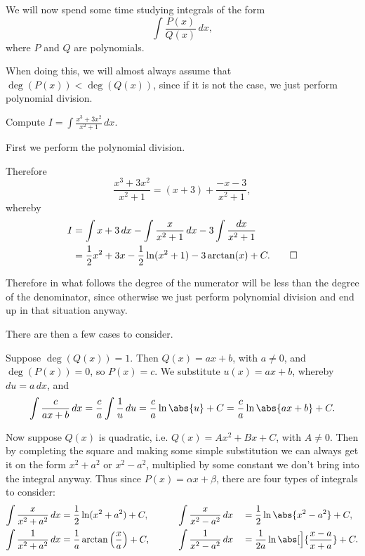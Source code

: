 
We will now spend some time studying integrals of the form
\[
	\int \frac{P(x)}{Q(x)} \, d x,
\]
where $P$ and $Q$ are polynomials.

When doing this, we will almost always assume that $\deg(P(x)) < \deg(Q(x))$, since if it is not the case, we just perform polynomial division.

\begin{example}
	Compute $I = \int \frac{x^3 + 3 x^2}{x^2 + 1} \, d x$.

	\smallskip

	First we perform the polynomial division.
	\begin{figure}[H]
		\centering
	\end{figure}

	\noindent
	Therefore
	\[
		\frac{x^3 + 3 x^2}{x^2 + 1} = (x + 3) + \frac{- x - 3}{x^2 + 1},
	\]
	whereby
	\begin{align*}
		I &= \int x + 3 \, d x - \int \frac{x}{x^2 + 1} \, d x - 3 \int \frac{d x}{x^2 + 1} \\
		  &= \frac{1}{2} x^2 + 3 x - \frac{1}{2} \ln(x^2 + 1) - 3 \arctan(x) + C. \qedhere
	\end{align*}
\end{example}

\noindent
Therefore in what follows the degree of the numerator will be less than the degree of the denominator, since otherwise we just perform polynomial division and end up in that situation anyway.

There are then a few cases to consider.

Suppose $\deg(Q(x)) = 1$.
Then $Q(x) = a x + b$, with $a \neq 0$, and $\deg(P(x)) = 0$, so $P(x) = c$.
We substitute $u(x) = a x + b$, whereby $d u = a \, d x$, and
\[
	\int \frac{c}{a x + b} \, d x = \frac{c}{a} \int \frac{1}{u} \, d u = \frac{c}{a} \ln\abs{u} + C = \frac{c}{a} \ln\abs{a x + b} + C.
\]

\noindent
Now suppose $Q(x)$ is quadratic, i.e. $Q(x) = A x^2 + B x + C$, with $A \neq 0$.
Then by completing the square and making some simple substitution we can always get it on the form $x^2 + a^2$ or $x^2 - a^2$, multiplied by some constant  we don't bring into the integral anyway.
Thus since $P(x) = \alpha x + \beta$, there are four types of integrals to consider:
\begin{alignat*}{5}
	\int \frac{x}{x^2 + a^2} \, d x &= \frac{1}{2} \ln(x^2 + a^2) + C, \qquad                  && \int \frac{x}{x^2 - a^2} \, d x &&= \frac{1}{2} \ln\abs{x^2 - a^2} + C, \\
	\int \frac{1}{x^2 + a^2} \, d x &= \frac{1}{a} \arctan\Big (\frac{x}{a} \Big ) + C, \qquad && \int \frac{1}{x^2 - a^2} \, d x &&= \frac{1}{2 a} \ln\abs[\Big]{\frac{x - a}{x + a}} + C.
\end{alignat*}

